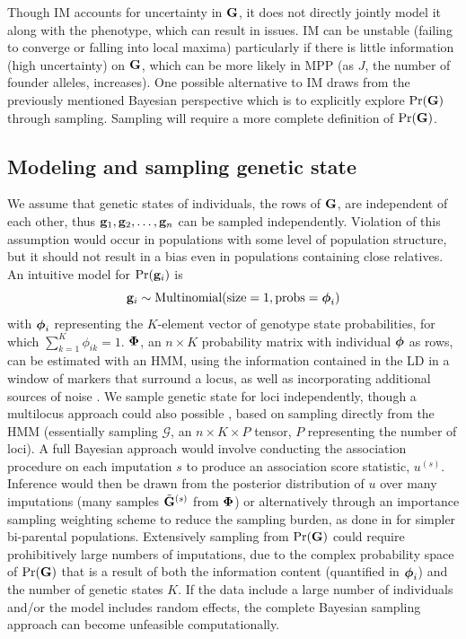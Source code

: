 Though IM accounts for uncertainty in $\mathbf{G}$, it does not directly jointly model it along with the phenotype, which can result in issues. IM can be unstable (failing to converge or falling into local maxima) particularly if there is little information (high uncertainty) on $\mathbf{G}$, which can be more likely in MPP (as $J$, the number of founder alleles, increases). One possible alternative to IM draws from the previously mentioned Bayesian perspective which is to explicitly explore $\text{Pr}(\mathbf{G})$ through sampling. Sampling will require a more complete definition of $\text{Pr}(\mathbf{G})$.

\subsection{Modeling and sampling genetic state}

We assume that genetic states of individuals, the rows of $\mathbf{G}$, are independent of each other, thus $\mathbf{g}_{1}, \mathbf{g}_{2}, \ldots, \mathbf{g}_{n}$ can be sampled independently. Violation of this assumption would occur in populations with some level of population structure, but it should not result in a bias even in populations containing close relatives. An intuitive model for $\text{Pr}(\mathbf{g}_{i})$ is
\begin{equation*}
	\mathbf{g}_{i} \sim \text{Multinomial}(\text{size}=1, \text{probs}=\boldsymbol{\phi}_{i})
\end{equation*}
with $\boldsymbol{\phi}_{i}$ representing the ${K}$-element vector of genotype state probabilities, for which $\sum_{k=1}^{K}\phi_{ik} = 1$. $\boldsymbol{\Phi}$, an $n \times K$ probability matrix with individual $\boldsymbol{\phi}$ as rows, can be estimated with an HMM, using the information contained in the LD in a window of markers that surround a locus, as well as incorporating additional sources of noise \citep{Mott2000,Fu2012}. We sample genetic state for loci independently, though a multilocus approach could also possible \citep{Sen2001}, based on sampling directly from the HMM (essentially sampling $\boldsymbol{\mathcal{G}}$, an $n \times K \times P$ tensor, $P$ representing the number of loci). A full Bayesian approach would involve conducting the association procedure on each imputation $s$ to produce an association score statistic, $u^{(s)}$. Inference would then be drawn from the posterior distribution of $u$ over many imputations (many samples $\tilde{\mathbf{G}}^{(s)}$ from $\boldsymbol{\Phi}$) or alternatively through an importance sampling weighting scheme to reduce the sampling burden, as done in \cite{Sen2001} for simpler bi-parental populations. Extensively sampling from $\text{Pr}(\mathbf{G})$ could require prohibitively large numbers of imputations, due to the complex probability space of $\text{Pr}(\mathbf{G})$ that is a result of both the information content (quantified in $\boldsymbol{\phi}_{i}$) and the number of genetic states $K$. If the data include a large number of individuals and/or the model includes random effects, the complete Bayesian sampling approach can become unfeasible computationally.

